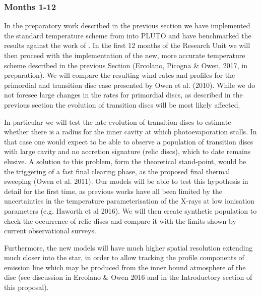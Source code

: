 \documentclass[10pt,fleqn,twoside]{article}
\begin{document}
\subsubsection{Months 1-12}
In the preparatory work described in the previous section we have
implemented the standard temperature scheme from 
\citet{2008ApJ...688..398E, 2009ApJ...699.1639E}
into PLUTO and have benchmarked the results against
the work of 
\citet{2010MNRAS.401.1415O}.
In the first 12 months of the Research
Unit we will then proceed with the implementation of the new, more accurate
temperature scheme described in the previous Section (Ercolano,
Picogna \& Owen, 2017, in preparation). We will compare the resulting
wind rates and profiles for the primordial and transition disc
case presented by Owen et al. (2010). While we do not foresee large
changes in the rates for primordial discs, as described in the
previous section the evolution of transition discs will be most 
likely affected. 

In particular we will test the late evolution of transition discs to
estimate whether there is a radius for the inner cavity at which
photoevaporation stalls. In that case one would expect to be able to
observe a population of transition discs with large cavity and no
accretion signature (relic discs), which to date remains elusive. A solution to this
problem, form the theoretical stand-point, would be the triggering of
a fast final clearing phase, as the proposed final thermal sweeping
(Owen et al. 2011). Our models will be able to test this hypothesis in
detail for the first time, as previous works have all been limited by
the uncertainties in the temperature parameterisation of the X-rays at
low ionisation parameters (e.g. Haworth et al 2016). We will then
create synthetic population to check the occurrence of relic discs and
compare it with the limits shown by current observational surveys. 

Furthermore, the new models will have much higher spatial
resolution extending much closer into the star, in order to allow
tracking the profile components of emission line which may be produced from the inner bound
atmosphere of the disc (see discussion in Ercolano \& Owen 2016 and in
the Introductory section of this proposal).

\end{document}

